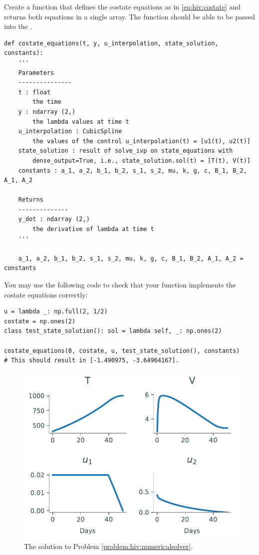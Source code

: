 \begin{problem}
Create a function that defines the costate equations as in \eqref{eq:hiv:costate} and returns both equations in a single array.
The function should be able to be passed into the .

\begin{lstlisting}
def costate_equations(t, y, u_interpolation, state_solution, constants):
    '''
    Parameters
    ---------------
    t : float
        the time
    y : ndarray (2,)
        the lambda values at time t 
    u_interpolation : CubicSpline
        the values of the control u_interpolation(t) = [u1(t), u2(t)]
    state_solution : result of solve_ivp on state_equations with
        dense_output=True, i.e., state_solution.sol(t) = [T(t), V(t)]
    constants : a_1, a_2, b_1, b_2, s_1, s_2, mu, k, g, c, B_1, B_2, A_1, A_2
    
    Returns
    --------------
    y_dot : ndarray (2,)
        the derivative of lambda at time t
    '''

    a_1, a_2, b_1, b_2, s_1, s_2, mu, k, g, c, B_1, B_2, A_1, A_2 = constants
\end{lstlisting}

You may use the following code to check that your function implements the costate equations correctly:

\begin{lstlisting}
u = lambda _: np.full(2, 1/2)
costate = np.ones(2)
class test_state_solution(): sol = lambda self, _: np.ones(2)

costate_equations(0, costate, u, test_state_solution(), constants)
# This should result in [-1.490975, -3.64964167].
\end{lstlisting}

\label{problem:hiv:costateequations}
\end{problem}


\begin{figure}
\centering
\includegraphics[width=5in]{figures/hiv_solution.pdf}
\caption{The solution to Problem \ref{problem:hiv:numericalsolver}.}
\label{fig:hiv:solutions}
\end{figure}

